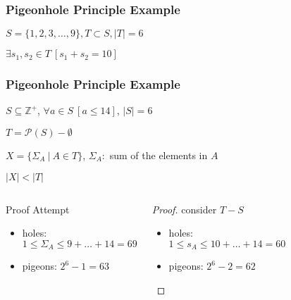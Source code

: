 \documentclass[dvipsnames]{beamer}
\begin{document}
\begin{frame}
  \frametitle{Pigeonhole Principle Example}

  \begin{theorem}
    $S = \{1,2,3,\dots,9\}, T \subset S, |T|=6$

    $\exists s_1, s_2 \in T~[s_1+s_2=10]$
  \end{theorem}
\end{frame}

\begin{frame}
  \frametitle{Pigeonhole Principle Example}

  \begin{theorem}
    $S \subseteq \mathbb{Z}^+$, $\forall a \in S~[a \leq 14]$, $|S|=6$

    $T = \mathcal{P}(S) - \emptyset$

    $X = \{\Sigma_A~|~A \in T\}$, $\Sigma_A:$ sum of the elements in $A$

    $|X| < |T|$
  \end{theorem}

  \pause
  \begin{columns}[t]
    \begin{block}{Proof Attempt}
      \begin{itemize}
        \item holes:\\
          $1 \leq \Sigma_A \leq 9 + \dots + 14 = 69$
        \item pigeons: $2^6 - 1 = 63$
      \end{itemize}
    \end{block}

    \pause
    \begin{proof}
      consider $T - S$

      \pause
      \begin{itemize}
        \item holes:\\
          $1 \leq s_A \leq 10 + \dots + 14 = 60$
        \item pigeons: $2^6 - 2 = 62$
      \end{itemize}
    \end{proof}
  \end{columns}
\end{frame}
\end{document}
